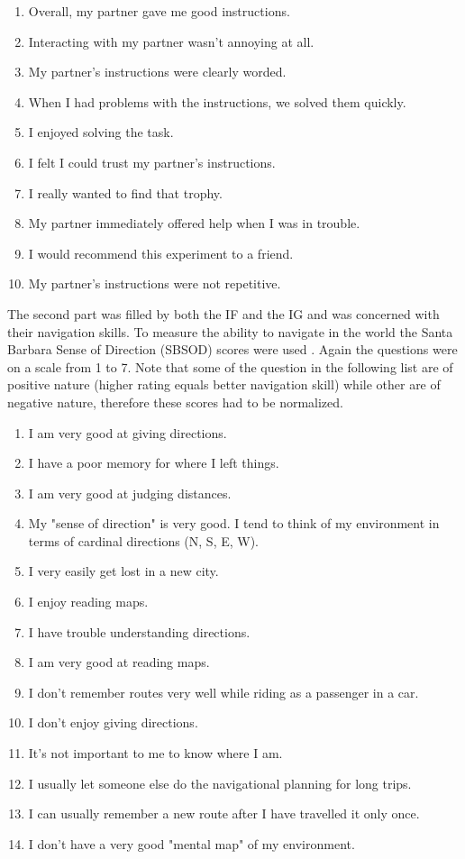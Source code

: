 \begin{enumerate}
\item
Overall, my partner gave me good instructions.
\item
Interacting with my partner wasn't annoying at all.
\item
My partner's instructions were clearly worded.
\item
When I had problems with the instructions, we solved them quickly.
\item
I enjoyed solving the task.
\item
I felt I could trust my partner's instructions.
\item
I really wanted to find that trophy.
\item
My partner immediately offered help when I was in trouble.
\item
I would recommend this experiment to a friend.
\item
My partner's instructions were not repetitive.
\end{enumerate}


The second part was filled by both the IF and the IG and was concerned with their navigation skills. To measure the ability to navigate in the world the Santa Barbara Sense of Direction (SBSOD) scores were used \citep{hegarty2002development}. Again the questions were on a scale from 1 to 7. Note that some of the question in the following list are of positive nature (higher rating equals better navigation skill) while other are of negative nature, therefore these scores had to be normalized.

\begin{enumerate}
\item
I am very good at giving directions.
\item
I have a poor memory for where I left things.
\item
I am very good at judging distances.
\item
My "sense of direction" is very good.
I tend to think of my environment in terms of cardinal directions (N, S, E, W).
\item
I very easily get lost in a new city.
\item
I enjoy reading maps.
\item
I have trouble understanding directions.
\item
I am very good at reading maps.
\item
I don't remember routes very well while riding as a passenger in a car.
\item
I don't enjoy giving directions.
\item
It's not important to me to know where I am.
\item
I usually let someone else do the navigational planning for long trips.
\item
I can usually remember a new route after I have travelled it only once.
\item
I don't have a very good "mental map" of my environment.
\end{enumerate}


